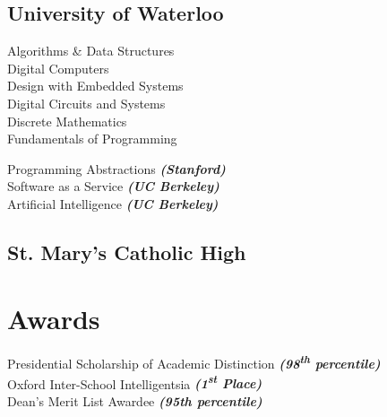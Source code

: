 \documentclass[letterpaper]{deedy-resume}
\begin{document}
\begin{minipage}[t]{0.33\textwidth}
\subsection{University of Waterloo}

\sectionspace %
Algorithms \& Data Structures\\
Digital Computers \\
Design with Embedded Systems \\
Digital Circuits and Systems \\
Discrete Mathematics \\
Fundamentals of Programming\\
\sectionspace %

Programming Abstractions {\footnotesize \textit{\textbf{(Stanford)}}}\\
Software as a Service {\footnotesize \textit{\textbf{(UC Berkeley)}}}\\
Artificial Intelligence {\footnotesize \textit{\textbf{(UC Berkeley)}}}\\

\sectionspace %


\subsection{St. Mary's Catholic High}

\sectionspace %
\section{Awards} 
Presidential Scholarship of Academic Distinction {\footnotesize \textit{\textbf{(98\textsuperscript{th} percentile)}}}\\
Oxford Inter-School Intelligentsia 
{\footnotesize \textit{\textbf{(1\textsuperscript{st} Place)}}}\\
Dean's Merit List Awardee 
{\footnotesize \textit{\textbf{(95th percentile)}}}\\

\sectionspace %


\end{minipage}
\end{document}
